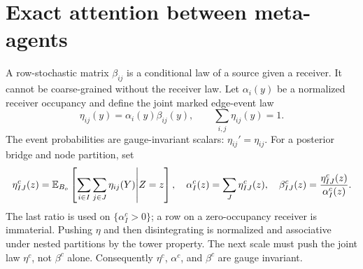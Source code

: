 \section{Exact attention between meta-agents}
\label{sec:rg-meta-attention}

A row-stochastic matrix $\beta_{ij}$ is a conditional law of a source given a
receiver.  It cannot be coarse-grained without the receiver law.  Let
$\alpha_i(y)$ be a normalized receiver occupancy and define the joint marked
edge-event law
\begin{equation}
\eta_{ij}(y)=\alpha_i(y)\beta_{ij}(y),
\qquad
\sum_{i,j}\eta_{ij}(y)=1.
\label{eq:rg-attention-event-law}
\end{equation}
The event probabilities are gauge-invariant scalars:
$\eta_{ij}'=\eta_{ij}$.
For a posterior bridge and node partition, set
\begin{equation}
\eta^c_{IJ}(z)
=\mathbb E_{B_o}\left[
\sum_{i\in I}\sum_{j\in J}\eta_{ij}(Y)
\middle|Z=z\right],
\quad
\alpha_I^c(z)=\sum_J\eta^c_{IJ}(z),
\quad
\beta^c_{IJ}(z)=\frac{\eta^c_{IJ}(z)}{\alpha_I^c(z)}.
\label{eq:rg-meta-attention}
\end{equation}
The last ratio is used on $\{\alpha_I^c>0\}$; a row on a zero-occupancy
receiver is immaterial.  Pushing $\eta$ and then disintegrating is normalized
and associative under nested partitions by the tower property.  The next
scale must push the joint law $\eta^c$, not $\beta^c$ alone.  Consequently
$\eta^c$, $\alpha^c$, and $\beta^c$ are gauge invariant.  

